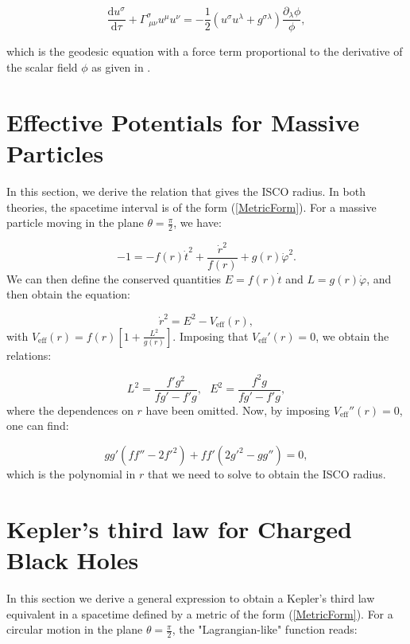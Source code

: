 \documentclass[floats,floatfix,aps, preprintnumbers,nofootinbib]{revtex4-2}
\newcommand{\bracket}[1]{\left[ #1 \right]}
\newcommand{\mrm}{\mathrm}
\begin{document}
\begin{equation}
    \frac{\mrm d u^\sigma}{\mrm d\tau} + \Gamma^\sigma_{\;\mu\nu}u^\mu u^\nu = -\frac{1}{2}(u^\sigma u^\lambda + g^{\sigma\lambda})\frac{\partial_\lambda\phi}{\phi},
\end{equation}

which is the geodesic equation with a force term proportional to the derivative of the scalar field $\phi$ as given in \cite{Chehab_2026}.

\section{Effective Potentials for Massive Particles}\label{appendix:ISCO}

In this section, we derive the relation that gives the ISCO radius. In both theories, the spacetime interval is of the form (\ref{MetricForm}). For a massive particle moving in the plane $\theta=\frac{\pi}{2}$, we have:

\begin{equation}
    -1 = -f(r)\dot t^2 + \frac{\dot r^2}{f(r)} + g(r)\dot \varphi^2.
\end{equation}
We can then define the conserved quantities $E = f(r)\dot t$ and $L = g(r)\dot\varphi$, and then obtain the equation:

\begin{equation}
    \dot r^2 = E^2 - V_\mrm{eff}(r),
\end{equation}
with $V_\mrm{eff}(r) = f(r)\bracket{1 + \frac{L^2}{g(r)}}$. Imposing that $V_\mrm{eff}'(r) = 0$, we obtain the relations:

\begin{equation}
    L^2 = \frac{f'g^2}{fg' - f'g}, \ \ \ E^2 = \frac{f^2g}{fg' - f'g},
\end{equation}
where the dependences on $r$ have been omitted. Now, by imposing $V_\mrm{eff}''(r) = 0$, one can find:

\begin{equation}
    gg'(ff'' - 2f'^2) + ff'(2g'^2 - gg'') = 0,
\end{equation}
which is the polynomial in $r$ that we need to solve to obtain the ISCO radius.

\section{Kepler's third law for Charged Black Holes}\label{appendix:kepler}

In this section we derive a general expression to obtain a Kepler's third law equivalent in a spacetime defined by a metric of the form (\ref{MetricForm}). For a circular motion in the plane $\theta = \frac{\pi}{2}$, the "Lagrangian-like" function reads:
\end{document}
